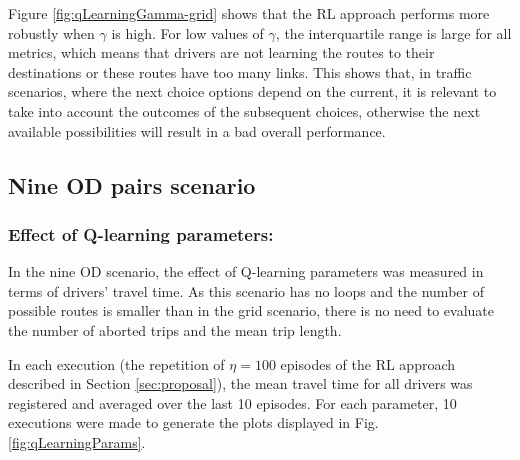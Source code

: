 \documentclass{RITA}
\newcommand{\numepis}{\ensuremath{\eta}}	%
\begin{document}
Figure \ref{fig:qLearningGamma-grid} shows that the RL approach performs more robustly when $\gamma$ is high. For low values of $\gamma$, the interquartile range is large for all metrics, which means that drivers are not learning the routes to their destinations or these routes have too many links. This shows that, in traffic scenarios, where the next choice options depend on the current, it is relevant to take into account the outcomes of the subsequent choices, otherwise the next available possibilities will result in a bad overall performance.

\subsection{Nine OD pairs scenario}

\subsubsection{Effect of Q-learning parameters:}
\label{sec:qlParamsNineOD}
In the nine OD scenario, the effect of Q-learning parameters was measured in terms of drivers' travel time. As this scenario has no loops and the number of possible routes is smaller than in the grid scenario, there is no need to evaluate the number of aborted trips and the mean trip length.

In each execution (the repetition of $\numepis = 100$ episodes of the RL approach described in Section \ref{sec:proposal}), the mean travel time for all drivers was registered and averaged over the last 10 episodes.  For each parameter, 10 executions were made to generate the plots displayed in Fig. \ref{fig:qLearningParams}.
\end{document}

